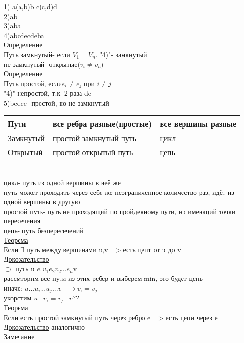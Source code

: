 \documentclass{article}
\begin{document}
1) a(a,b)b c(c,d)d\\
2)ab\\
3)aba\\
4)abcdecdeba\\
\underline{Определение}\\
Путь замкнутый- если $V_1=V_n$. "4)"- замкнутый\\
не замкнутый- открытые($v_i\neq v_n$)\\
\underline{Определение}\\
Путь простой, если$e_i \neq e_j$ при $i\neq j$\\
"4)" непростой, т.к. 2 раза de\\
5)bedce- простой, но не замкнутый\\
\begin{tabular}{l|l|l}
Пути& все ребра разные(простые)& все вершины разные \\
\hline
Замкнутый & простой замкнутый путь & цикл\\
\hline
Открытый & простой открытый путь & цепь\\
\hline
\end{tabular}\\
цикл- путь из одной вершины в неё же\\
путь может проходить через себя же неограниченное количество раз, идёт из одной вершины в другую\\
простой путь- путь не проходящий по пройденному пути, но имеющий точки пересечения\\
цепь- путь безпересечений\\
\underline{Теорема}\\
Если $\exists$ путь между вершинами u,v => есть цепт от u до v\\
\underline{Докозательство}\\
$\supset$ путь u $e_1v_1e_2v_2...e_n$v\\
рассмторим все пути из этих ребер и выберем min, это будет цепь\\
иначе: $u...u_i...u_j...v \quad \supset v_i=v_j$\\
укоротим $u...v_i=v_j...v$??\\
\underline{Теорема}\\
Если есть простой замкнутый путь через ребро e => есть цепи через е\\
\underline{Докозательство} аналогично\\
Замечание\\
\\
\end{document}
